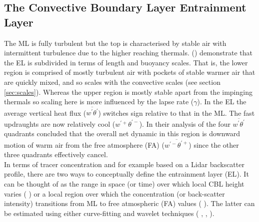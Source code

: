 \subsection{The Convective Boundary Layer Entrainment Layer}
\label{subsec:}

The \acs{ML} is fully turbulent but the top is characterised by stable air with intermittent turbulence due to the higher reaching thermals. \citeauthor{GarciaMellado} (\citeyear{GarciaMellado}) demonstrate that the \acs{EL} is subdivided in terms of length and buoyancy scales.  That is, the lower region is comprised of mostly turbulent air with pockets of stable warmer air that are quickly mixed, and so scales with the convective scales (see section \ref{sec:scales}). Whereas the upper region is mostly stable apart from the impinging thermals so scaling here is more influenced by the lapse rate ($\gamma$).  In the \acs{EL} the average vertical heat flux ($\overline{w^{'}\theta^{'}}$) switches sign relative to that in the \acs{ML}.  The fast updraughts are now relatively cool ($w^{'+}\theta^{'-}$).  In their analysis of the four $\overline{w^{'}\theta^{'}}$ quadrants \citeauthor{SullMoengStev} \cite{SullMoengStev} concluded that the overall net dynamic in this region is downward motion of warm air from the free atmosphere (\acs{FA}) ($\overline{w^{'-}\theta^{'+}}$) since the other three quadrants effectively cancel.\\

In terms of tracer concentration and for example based on a Lidar backscatter profile, there are two ways to conceptually define the entrainment layer (\acs{EL}).  It can be thought of as the range in space (or time) over which local \acs{CBL} height varies (\citeauthor{CrumStullEl} \citeyear{CrumStullEl}) or a local region over which the concentration (or back-scatter intensity) transitions from \acs{ML} to free atmospheric (\acs{FA}) values (\citeauthor{Traum11} \citeyear{Traum11}).  The latter can be estimated using either curve-fitting and wavelet techniques (\citeauthor{Traum11} \cite{Traum11}, \citeauthor{SteynBaldHoff} \cite{SteynBaldHoff}, \citeauthor{BrooksFowler2} \cite{BrooksFowler2}).\\

